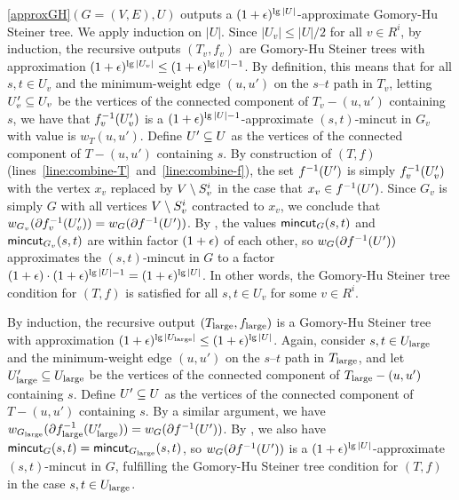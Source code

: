 \BL{}
\ref{approxGH}$(G=(V,E),U)$ outputs a $(1+\epsilon)^{\lg|U|}$-approximate Gomory-Hu Steiner tree.
\EL
\BP
We apply induction on $|U|$. 
Since $|U_v|\le|U|/2$ for all $v\in R^i$, by induction, the recursive outputs $(T_v,f_v)$ are Gomory-Hu Steiner trees with approximation $(1+\epsilon)^{\lg|U_v|}\le(1+\epsilon)^{\lg|U|-1}$.  By definition, this means that for all $s,t\in U_v$ and the minimum-weight edge $(u,u')$ on the $s$--$t$ path in $T_v$, letting $U'_v\subseteq U_v$ be the vertices of the connected component of $T_v-(u,u')$ containing $s$, we have that $f^{-1}_v(U'_v)$ is a $(1+\epsilon)^{\lg|U|-1}$-approximate $(s,t)$-mincut in $G_v$ with value is $w_T(u,u')$. Define $U'\subseteq U$ as the vertices of the connected component of $T-(u,u')$ containing $s$. By construction of $(T,f)$ (lines~\ref{line:combine-T}~and~\ref{line:combine-f}), the set $f^{-1}(U')$ is simply $f^{-1}_v(U'_v)$ with the vertex $x_v$ replaced by $V\setminus S^i_v$ in the case that $x_v\in f^{-1}(U')$. Since $G_v$ is simply $G$ with all vertices $V\setminus S^i_v$ contracted to $x_v$, we conclude that $w_{G_v}(\partial f^{-1}_v(U'_v)) = w_G(\partial f^{-1}(U'))$. By , the values $\textsf{\textup{mincut}}_G(s,t)$ and $\textsf{\textup{mincut}}_{G_v}(s,t)$ are within factor $(1+\epsilon)$ of each other, so $w_G(\partial f^{-1}(U'))$ approximates the $(s,t)$-mincut in $G$ to a factor $(1+\epsilon)\cdot(1+\epsilon)^{\lg|U|-1} = (1+\epsilon)^{\lg|U|}$. In other words, the Gomory-Hu Steiner tree condition for $(T,f)$ is satisfied for all $s,t\in U_v$ for some $v\in R^i$.

By induction, the recursive output $(T_{\textup{large}},f_{\textup{large}})$ is a Gomory-Hu Steiner tree with approximation $(1+\epsilon)^{\lg|U_{\textup{large}}|}\le(1+\epsilon)^{\lg|U|}$. Again, consider $s,t\in U_{\textup{large}}$ and the minimum-weight edge $(u,u')$ on the $s$--$t$ path in $T_{\textup{large}}$, and let $U'_{\textup{large}}\subseteq U_{\textup{large}}$ be the vertices of the connected component of $T_{\textup{large}}-(u,u')$ containing $s$. Define $U'\subseteq U$ as the vertices of the connected component of $T-(u,u')$ containing $s$. By a similar argument, we have $w_{G_{\textup{large}}}(\partial f^{-1}_{\textup{large}}(U'_{\textup{large}})) = w_G(\partial f^{-1}(U'))$. By , we also have\linebreak $\textsf{\textup{mincut}}_G(s,t)=\textsf{\textup{mincut}}_{G_{\textup{large}}}(s,t)$, so $w_G(\partial f^{-1}(U'))$ is a $(1+\epsilon)^{\lg|U|}$-approximate $(s,t)$-mincut in $G$, fulfilling the Gomory-Hu Steiner tree condition for $(T,f)$ in the case $s,t\in U_{\textup{large}}$.

